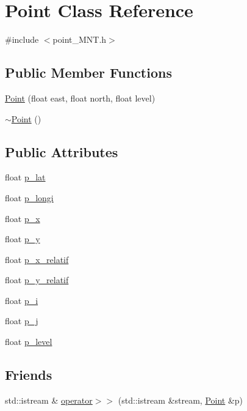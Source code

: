 \hypertarget{class_point}{}\section{Point Class Reference}
\label{class_point}


{\ttfamily \#include $<$point\+\_\+\+M\+N\+T.\+h$>$}

\subsection*{Public Member Functions}
\begin{DoxyCompactItemize}
\item 
\hyperlink{class_point_a11e86874da3294d7ea8b35be9cd5bd9c}{Point} (float east, float north, float level)
\item 
\hyperlink{class_point_a395fa04b4ec126b66fc053f829a30cc1}{$\sim$\+Point} ()
\end{DoxyCompactItemize}
\subsection*{Public Attributes}
\begin{DoxyCompactItemize}
\item 
float \hyperlink{class_point_a358899abd4e51fdd5322b76a8324ef90}{p\+\_\+lat}
\item 
float \hyperlink{class_point_acee2bfc413dce3e1b69524e85305980b}{p\+\_\+longi}
\item 
float \hyperlink{class_point_a7ed90ddaad8bfac738d4ac9a7b6f620f}{p\+\_\+x}
\item 
float \hyperlink{class_point_a420b83b0054d2ffc151aac30585c7f4a}{p\+\_\+y}
\item 
float \hyperlink{class_point_ae85c8ed96afee827cddee534ae367787}{p\+\_\+x\+\_\+relatif}
\item 
float \hyperlink{class_point_af5a6763229a95cb09ef94d605fe3307a}{p\+\_\+y\+\_\+relatif}
\item 
float \hyperlink{class_point_add37feb7f6e9ccb3d5ba201d82b7f7a7}{p\+\_\+i}
\item 
float \hyperlink{class_point_a53ddf5fde2dd3c2e68cf64bc6ebd6951}{p\+\_\+j}
\item 
float \hyperlink{class_point_a40457fd9b36c4414907fa67d8d99f119}{p\+\_\+level}
\end{DoxyCompactItemize}
\subsection*{Friends}
\begin{DoxyCompactItemize}
\item 
std\+::istream \& \hyperlink{class_point_af31c1932671eb01dfe5679f3c2dc6a40}{operator$>$$>$} (std\+::istream \&stream, \hyperlink{class_point}{Point} \&p)
\end{DoxyCompactItemize}


